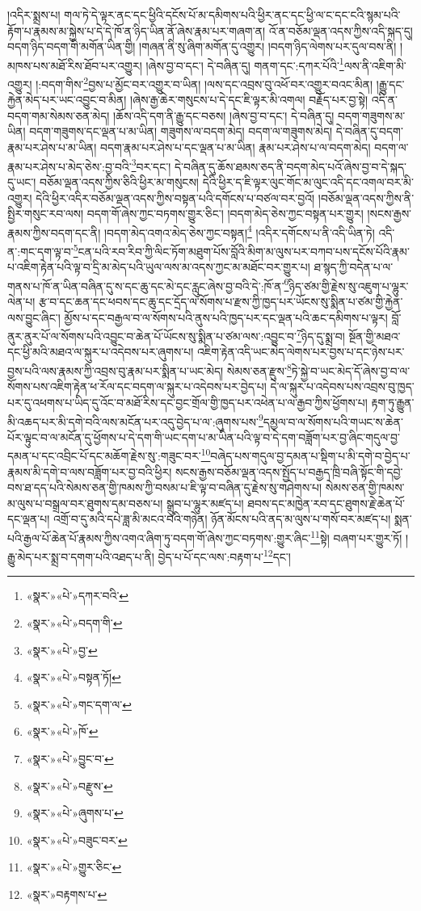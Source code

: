 །འདིར་སྨྲས་པ། གལ་ཏེ་དེ་ལྟར་ནང་དང་ཕྱིའི་དངོས་པོ་མ་དམིགས་པའི་ཕྱིར་ནང་དང་ཕྱི་ལ་ང་དང་ངའི་སྙམ་པའི་རྟོག་པ་རྣམས་མ་སྐྱེས་པ་དེ་དེ་ཁོ་ན་ཉིད་ཡིན་ནོ་ཞེས་རྣམ་པར་གཞག་ན། འོ་ན་བཅོམ་ལྡན་འདས་ཀྱིས་འདི་སྐད་དུ། བདག་ཉིད་བདག་གི་མགོན་ཡིན་གྱི། །གཞན་ནི་སུ་ཞིག་མགོན་དུ་འགྱུར། །བདག་ཉིད་ལེགས་པར་དུལ་བས་ནི། །མཁས་པས་མཐོ་རིས་ཐོབ་པར་འགྱུར། །ཞེས་བྱ་བ་དང་། དེ་བཞིན་དུ། གནག་དང་:དཀར་པོའི་\footnote{«སྣར་»«པེ་»དཀར་བའི་}ལས་ནི་འཇིག་མི་འགྱུར། །:བདག་གིས་\footnote{«སྣར་»«པེ་»བདག་གི་}བྱས་པ་མྱོང་བར་འགྱུར་བ་ཡིན། །ལས་དང་འབྲས་བུ་འཕོ་བར་འགྱུར་བའང་མིན། །རྒྱུ་དང་རྐྱེན་མེད་པར་ཡང་འབྱུང་བ་མིན། །ཞེས་རྒྱ་ཆེར་གསུངས་པ་དེ་དང་ཇི་ལྟར་མི་འགལ། བརྗོད་པར་བྱ་སྟེ། འདི་ན་བདག་གམ་སེམས་ཅན་མེད། །ཆོས་འདི་དག་ནི་རྒྱུ་དང་བཅས། །ཞེས་བྱ་བ་དང་། དེ་བཞིན་དུ། བདག་གཟུགས་མ་ཡིན། བདག་གཟུགས་དང་ལྡན་པ་མ་ཡིན། གཟུགས་ལ་བདག་མེད། བདག་ལ་གཟུགས་མེད། དེ་བཞིན་དུ་བདག་རྣམ་པར་ཤེས་པ་མ་ཡིན། བདག་རྣམ་པར་ཤེས་པ་དང་ལྡན་པ་མ་ཡིན། རྣམ་པར་ཤེས་པ་ལ་བདག་མེད། བདག་ལ་རྣམ་པར་ཤེས་པ་མེད་ཅེས་:བྱ་བའི་\footnote{«སྣར་»«པེ་»བྱ་}བར་དང་། དེ་བཞིན་དུ་ཆོས་ཐམས་ཅད་ནི་བདག་མེད་པའོ་ཞེས་བྱ་བ་དེ་སྐད་དུ་ཡང་། བཅོམ་ལྡན་འདས་ཀྱིས་ཅིའི་ཕྱིར་མ་གསུངས། དེའི་ཕྱིར་ད་ཇི་ལྟར་ལུང་གོང་མ་ལུང་འདི་དང་འགལ་བར་མི་འགྱུར། དེའི་ཕྱིར་འདིར་བཅོམ་ལྡན་འདས་ཀྱིས་བསྟན་པའི་དགོངས་པ་བཙལ་བར་བྱའོ། །བཅོམ་ལྡན་འདས་ཀྱིས་ནི་སྤྱིར་གསུང་རབ་ལས། བདག་གོ་ཞེས་ཀྱང་བཏགས་གྱུར་ཅིང་། །བདག་མེད་ཅེས་ཀྱང་བསྟན་པར་གྱུར། །སངས་རྒྱས་རྣམས་ཀྱིས་བདག་དང་ནི། །བདག་མེད་འགའ་མེད་ཅེས་ཀྱང་བསྟན།\footnote{«སྣར་»«པེ་»བསྟན་ཏོ།} །འདིར་དགོངས་པ་ནི་འདི་ཡིན་ཏེ། འདི་ན་:གང་དག་ལྟ་བ་\footnote{«སྣར་»«པེ་»གང་དག་ལ་}ངན་པའི་རབ་རིབ་ཀྱི་ལིང་ཏོག་མཐུག་པོས་བློའི་མིག་མ་ལུས་པར་བཀབ་པས་དངོས་པོའི་རྣམ་པ་འཇིག་རྟེན་པའི་ལྟ་བ་དྲི་མ་མེད་པའི་ཡུལ་ལས་མ་འདས་ཀྱང་མ་མཐོང་བར་གྱུར་པ། ཐ་སྙད་ཀྱི་བདེན་པ་ལ་གནས་པ་ཁོ་ན་ཡིན་བཞིན་དུ་ས་དང་ཆུ་དང་མེ་དང་རླུང་ཞེས་བྱ་བའི་དེ་:ཁོ་ན་\footnote{«སྣར་»«པེ་»ཁོ་}ཉིད་ཙམ་གྱི་རྗེས་སུ་འཇུག་པ་ལྷུར་ལེན་པ། རྩ་བ་དང་ཆན་དང་ཕབས་དང་ཆུ་དང་དྲོད་ལ་སོགས་པ་རྫས་ཀྱི་ཁྱད་པར་ཡོངས་སུ་སྨིན་པ་ཙམ་གྱི་རྐྱེན་ལས་བྱུང་ཞིང་། མྱོས་པ་དང་བརྒྱལ་བ་ལ་སོགས་པའི་ནུས་པའི་ཁྱད་པར་དང་ལྡན་པའི་ཆང་དམིགས་པ་ལྟར། བློ་ནུར་ནུར་པོ་ལ་སོགས་པའི་འབྱུང་བ་ཆེན་པོ་ཡོངས་སུ་སྨིན་པ་ཙམ་ལས་:འབྱུང་བ་\footnote{«སྣར་»«པེ་»བྱུང་བ་}ཉིད་དུ་སྨྲ་བ། སྔོན་གྱི་མཐའ་དང་ཕྱི་མའི་མཐའ་ལ་སྐུར་པ་འདེབས་པར་ཞུགས་པ། འཇིག་རྟེན་འདི་ཡང་མེད་ལེགས་པར་བྱས་པ་དང་ཉེས་པར་བྱས་པའི་ལས་རྣམས་ཀྱི་འབྲས་བུ་རྣམ་པར་སྨིན་པ་ཡང་མེད། སེམས་ཅན་རྫུས་\footnote{«སྣར་»«པེ་»བརྫུས་}ཏེ་སྐྱེ་བ་ཡང་མེད་དོ་ཞེས་བྱ་བ་ལ་སོགས་པས་འཇིག་རྟེན་ཕ་རོལ་དང་བདག་ལ་སྐུར་པ་འདེབས་པར་བྱེད་པ། དེ་ལ་སྐུར་པ་འདེབས་པས་འབྲས་བུ་ཁྱད་པར་དུ་འཕགས་པ་ཡིད་དུ་འོང་བ་མཐོ་རིས་དང་བྱང་གྲོལ་གྱི་ཁྱད་པར་འཕེན་པ་ལ་རྒྱབ་ཀྱིས་ཕྱོགས་པ། རྟག་ཏུ་རྒྱུན་མི་འཆད་པར་མི་དགེ་བའི་ལས་མངོན་པར་འདུ་བྱེད་པ་ལ་:ཞུགས་པས་\footnote{«སྣར་»«པེ་»ཞུགས་པ་}དམྱལ་བ་ལ་སོགས་པའི་གཡང་ས་ཆེན་པོར་ལྟུང་བ་ལ་མངོན་དུ་ཕྱོགས་པ་དེ་དག་གི་ཡང་དག་པ་མ་ཡིན་པའི་ལྟ་བ་དེ་དག་བཟློག་པར་བྱ་ཞིང་གདུལ་བྱ་དམན་པ་དང་འབྲིང་པོ་དང་མཆོག་རྗེས་སུ་:གཟུང་བར་\footnote{«སྣར་»«པེ་»བཟུང་བར་}བཞེད་པས་གདུལ་བྱ་དམན་པ་སྡིག་པ་མི་དགེ་བ་བྱེད་པ་རྣམས་མི་དགེ་བ་ལས་བཟློག་པར་བྱ་བའི་ཕྱིར། སངས་རྒྱས་བཅོམ་ལྡན་འདས་སྤྱོད་པ་བརྒྱད་ཁྲི་བཞི་སྟོང་གི་དབྱེ་བས་ཐ་དད་པའི་སེམས་ཅན་གྱི་ཁམས་ཀྱི་བསམ་པ་ཇི་ལྟ་བ་བཞིན་དུ་རྗེས་སུ་གཤེགས་པ། སེམས་ཅན་གྱི་ཁམས་མ་ལུས་པ་བསྒྲལ་བར་ཐུགས་དམ་བཅས་པ། སྒྲུབ་པ་ལྷུར་མཛད་པ། ཐབས་དང་མཁྱེན་རབ་དང་ཐུགས་རྗེ་ཆེན་པོ་དང་ལྡན་པ། འགྲོ་བ་དུ་མའི་དཔེ་ཟླ་མི་མངའ་བའི་གཉེན། ཉོན་མོངས་པའི་ནད་མ་ལུས་པ་གསོ་བར་མཛད་པ། སྨན་པའི་རྒྱལ་པོ་ཆེན་པོ་རྣམས་ཀྱིས་འགའ་ཞིག་ཏུ་བདག་གོ་ཞེས་ཀྱང་བཏགས་:གྱུར་ཞིང་\footnote{«སྣར་»«པེ་»གྱུར་ཅིང་}སྟེ། བཞག་པར་གྱུར་ཏོ། །རྒྱུ་མེད་པར་སྨྲ་བ་དགག་པའི་འཐད་པ་ནི། བྱེད་པ་པོ་དང་ལས་:བརྟག་པ་\footnote{«སྣར་»བརྟགས་པ་}དང་། 